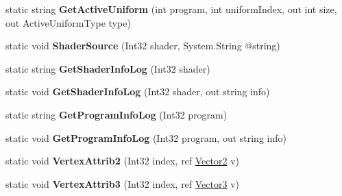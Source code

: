 \begin{DoxyCompactItemize}
\item 
\hypertarget{class_open_t_k_1_1_graphics_1_1_e_s20_1_1_g_l_a9b0b8a2174a1b121d7a9e055f63ff13c}{static string {\bfseries Get\-Active\-Uniform} (int program, int uniform\-Index, out int size, out Active\-Uniform\-Type type)}\label{class_open_t_k_1_1_graphics_1_1_e_s20_1_1_g_l_a9b0b8a2174a1b121d7a9e055f63ff13c}

\item 
\hypertarget{class_open_t_k_1_1_graphics_1_1_e_s20_1_1_g_l_ad80cad6e7164cf089a8a1143f93dae4a}{static void {\bfseries Shader\-Source} (Int32 shader, System.\-String @string)}\label{class_open_t_k_1_1_graphics_1_1_e_s20_1_1_g_l_ad80cad6e7164cf089a8a1143f93dae4a}

\item 
\hypertarget{class_open_t_k_1_1_graphics_1_1_e_s20_1_1_g_l_af68d11d28ee83f2abf7f6f342f052913}{static string {\bfseries Get\-Shader\-Info\-Log} (Int32 shader)}\label{class_open_t_k_1_1_graphics_1_1_e_s20_1_1_g_l_af68d11d28ee83f2abf7f6f342f052913}

\item 
\hypertarget{class_open_t_k_1_1_graphics_1_1_e_s20_1_1_g_l_a02a3e42517c7cecef58b7da9748e416b}{static void {\bfseries Get\-Shader\-Info\-Log} (Int32 shader, out string info)}\label{class_open_t_k_1_1_graphics_1_1_e_s20_1_1_g_l_a02a3e42517c7cecef58b7da9748e416b}

\item 
\hypertarget{class_open_t_k_1_1_graphics_1_1_e_s20_1_1_g_l_afd3a715f9133da9586ff6bb2cdb0fda6}{static string {\bfseries Get\-Program\-Info\-Log} (Int32 program)}\label{class_open_t_k_1_1_graphics_1_1_e_s20_1_1_g_l_afd3a715f9133da9586ff6bb2cdb0fda6}

\item 
\hypertarget{class_open_t_k_1_1_graphics_1_1_e_s20_1_1_g_l_ab5a6114cfabaedc8029ba464d3902874}{static void {\bfseries Get\-Program\-Info\-Log} (Int32 program, out string info)}\label{class_open_t_k_1_1_graphics_1_1_e_s20_1_1_g_l_ab5a6114cfabaedc8029ba464d3902874}

\item 
\hypertarget{class_open_t_k_1_1_graphics_1_1_e_s20_1_1_g_l_aaae02155cf99357292e02983a620cb35}{static void {\bfseries Vertex\-Attrib2} (Int32 index, ref \hyperlink{struct_open_t_k_1_1_vector2}{Vector2} v)}\label{class_open_t_k_1_1_graphics_1_1_e_s20_1_1_g_l_aaae02155cf99357292e02983a620cb35}

\item 
\hypertarget{class_open_t_k_1_1_graphics_1_1_e_s20_1_1_g_l_a57b7194eb5af631592bcd23f74613dbf}{static void {\bfseries Vertex\-Attrib3} (Int32 index, ref \hyperlink{struct_open_t_k_1_1_vector3}{Vector3} v)}\label{class_open_t_k_1_1_graphics_1_1_e_s20_1_1_g_l_a57b7194eb5af631592bcd23f74613dbf}


\end{DoxyCompactItemize}
